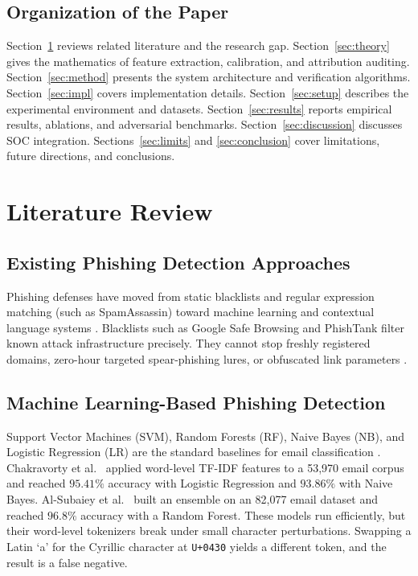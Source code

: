 \documentclass[conference]{IEEEtran}
\begin{document}
\subsection{Organization of the Paper}
Section~\ref{sec:lit} reviews related literature and the research gap. Section~\ref{sec:theory} gives the mathematics of feature extraction, calibration, and attribution auditing. Section~\ref{sec:method} presents the system architecture and verification algorithms. Section~\ref{sec:impl} covers implementation details. Section~\ref{sec:setup} describes the experimental environment and datasets. Section~\ref{sec:results} reports empirical results, ablations, and adversarial benchmarks. Section~\ref{sec:discussion} discusses SOC integration. Sections~\ref{sec:limits} and \ref{sec:conclusion} cover limitations, future directions, and conclusions.

\section{Literature Review}
\label{sec:lit}

\subsection{Existing Phishing Detection Approaches}
Phishing defenses have moved from static blacklists and regular expression matching (such as SpamAssassin) toward machine learning and contextual language systems \cite{cui2017}. Blacklists such as Google Safe Browsing and PhishTank filter known attack infrastructure precisely. They cannot stop freshly registered domains, zero-hour targeted spear-phishing lures, or obfuscated link parameters \cite{sheng2009}.

\subsection{Machine Learning-Based Phishing Detection}
Support Vector Machines (SVM), Random Forests (RF), Naive Bayes (NB), and Logistic Regression (LR) are the standard baselines for email classification \cite{dada2019}. Chakravorty et al.~\cite{chakravorty2026} applied word-level TF-IDF features to a 53,970 email corpus and reached $95.41\%$ accuracy with Logistic Regression and $93.86\%$ with Naive Bayes. Al-Subaiey et al.~\cite{alsubaiey2024} built an ensemble on an 82,077 email dataset and reached $96.8\%$ accuracy with a Random Forest. These models run efficiently, but their word-level tokenizers break under small character perturbations. Swapping a Latin `a' for the Cyrillic character at \texttt{U+0430} yields a different token, and the result is a false negative.
\end{document}
